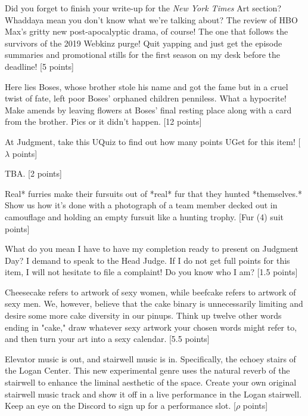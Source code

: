 \documentclass{book}
\begin{document}
\begin{list}{}{}
\item Did you forget to finish your write-up for the \textit{New York Times} Art section? Whaddaya mean you don’t know what we're talking about? The review of HBO Max’s gritty new post-apocalyptic drama, of course! The one that follows the survivors of the 2019 Webkinz purge! Quit yapping and just get the episode summaries and promotional stills for the first season on my desk before the deadline! [5 points]
\item Here lies Boses, whose brother stole his name and got the fame but in a cruel twist of fate, left poor Boses’ orphaned children penniless. What a hypocrite! Make amends by leaving flowers at Boses’ final resting place along with a card from the brother. Pics or it didn’t happen. [12 points]
\item At Judgment, take this UQuiz to find out how many points UGet for this item! [$\lambda$ points]
\newpage
\item TBA. [2 points] %
\item *Real* furries make their fursuits out of *real* fur that they hunted *themselves.* Show us how it's done with a photograph of a team member decked out in camouflage and holding an empty fursuit like a hunting trophy. [Fur (4) suit points]
\item What do you mean I have to have my completion ready to present on Judgment Day? I demand to speak to the Head Judge. If I do not get full points for this item, I will not hesitate to file a complaint! Do you know who I am? [1.5 points]
\item Cheesecake refers to artwork of sexy women, while beefcake refers to artwork of sexy men. We, however, believe that the cake binary is unnecessarily limiting and desire some more cake diversity in our pinups. Think up twelve other words ending in "cake," draw whatever sexy artwork your chosen words might refer to, and then turn your art into a sexy calendar. [5.5 points]
\item Elevator music is out, and stairwell music is in. Specifically, the echoey stairs of the Logan Center. This new experimental genre uses the natural reverb of the stairwell to enhance the liminal aesthetic of the space. Create your own original stairwell music track and show it off in a live performance in the Logan stairwell. Keep an eye on the Discord to sign up for a performance slot. [$\rho$ points]

\end{list}
\end{document}
